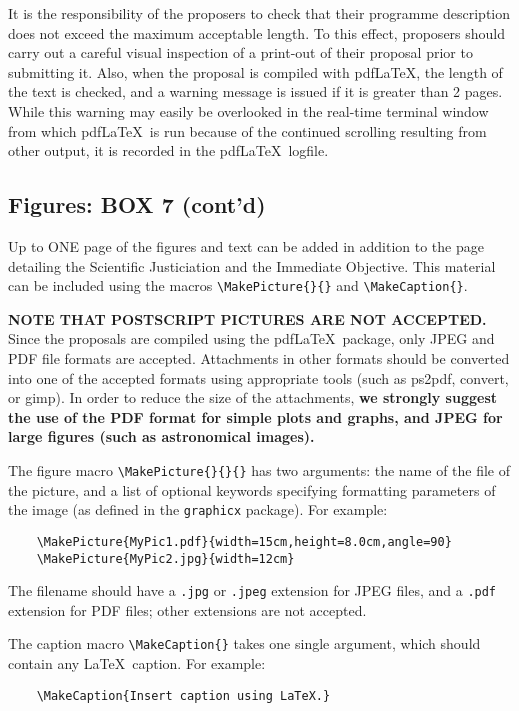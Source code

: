\documentclass{article}
\begin{document}
It is the responsibility of the proposers to check that their
programme description does not exceed the maximum acceptable
length. To this effect, proposers should carry out a careful visual
inspection of a print-out of their proposal prior to submitting
it. Also, when the proposal is compiled with pdf\LaTeX, the length of
the text is checked, and a warning message is issued if it is greater
than 2 pages. While this warning may easily be overlooked in the
real-time terminal window from which pdf\LaTeX\ is run because of the
continued scrolling resulting from other output, it is recorded in the
pdf\LaTeX\ logfile.


\subsection{Figures: {\bf BOX 7 (cont'd)}}

Up to ONE page of the figures and text can be added in addition to the 
page detailing the Scientific Justiciation and the Immediate Objective.
This material can be included using the macros \verb|\MakePicture{}{}|
and \verb|\MakeCaption{}|. 

{\bf NOTE THAT POSTSCRIPT PICTURES ARE NOT ACCEPTED.} Since the
proposals are compiled using the pdf\LaTeX\ package, only JPEG and PDF
file formats are accepted.  Attachments in other formats should be
converted into one of the accepted formats using appropriate tools
(such as ps2pdf, convert, or gimp).  In order to reduce the size of
the attachments, {\bf we strongly suggest the use of the PDF format for
  simple plots and graphs, and JPEG for large figures (such as
  astronomical images).}

The figure macro \verb|\MakePicture{}{}{}| has two arguments: the name
of the file of the picture, and a list of optional keywords specifying
formatting parameters of the image (as defined in the {\tt graphicx}
package). For example:
\begin{verbatim}
    \MakePicture{MyPic1.pdf}{width=15cm,height=8.0cm,angle=90}
    \MakePicture{MyPic2.jpg}{width=12cm}
\end{verbatim}
The filename should have a {\tt .jpg} or {\tt .jpeg} extension for
JPEG files, and a {\tt .pdf} extension for PDF files; other extensions
are not accepted. 

The  caption macro \verb|\MakeCaption{}| takes one single  argument,
which should contain any \LaTeX\ caption. For example:
\begin{verbatim}
    \MakeCaption{Insert caption using LaTeX.}
\end{verbatim}
\end{document}
